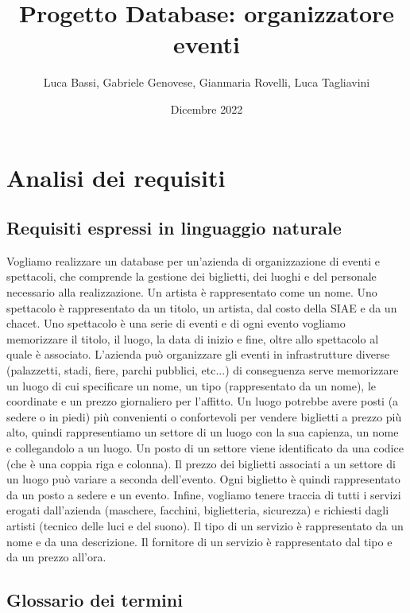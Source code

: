 \documentclass[a4paper,11pt]{article}
\title{Progetto Database: organizzatore eventi}
\author{Luca Bassi, Gabriele Genovese, Gianmaria Rovelli, Luca Tagliavini}
\date{Dicembre 2022}
\begin{document}
\maketitle

\tableofcontents

\section{Analisi dei requisiti}

\subsection{Requisiti espressi in linguaggio naturale}

Vogliamo realizzare un database per un'azienda di organizzazione di eventi e spettacoli, che comprende la gestione dei biglietti, dei luoghi e del personale necessario alla realizzazione.
Un artista è rappresentato come un nome. Uno spettacolo è rappresentato da un titolo, un artista, dal costo della SIAE e da un chacet. Uno spettacolo è una serie di eventi e di ogni evento vogliamo memorizzare il titolo, il luogo, la data di inizio e fine, oltre allo spettacolo al quale è associato. L'azienda può organizzare gli eventi in infrastrutture diverse (palazzetti, stadi, fiere, parchi pubblici, etc...) di conseguenza serve memorizzare un luogo di cui specificare un nome, un tipo (rappresentato da un nome), le coordinate e un prezzo giornaliero per l'affitto. Un luogo potrebbe avere posti (a sedere o in piedi) più convenienti o confortevoli per vendere biglietti a prezzo più alto, quindi rappresentiamo un settore di un luogo con la sua capienza, un nome e collegandolo a un luogo. Un posto di un settore viene identificato da una codice (che è una coppia riga e colonna). Il prezzo dei biglietti associati a un settore di un luogo può variare a seconda dell'evento. Ogni biglietto è quindi rappresentato da un posto a sedere e un evento. Infine, vogliamo tenere traccia di tutti i servizi erogati dall'azienda (maschere, facchini, biglietteria, sicurezza) e richiesti dagli artisti (tecnico delle luci e del suono). Il tipo di un servizio è rappresentato da un nome e da una descrizione. Il fornitore di un servizio è rappresentato dal tipo e da un prezzo all'ora.

\subsection{Glossario dei termini}
\end{document}
